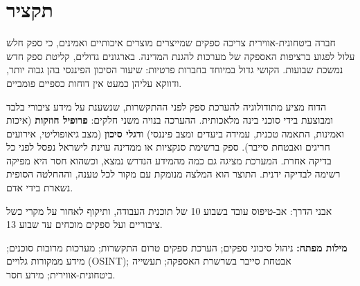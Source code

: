 \chapter*{תקציר}

חברה ביטחונית-אווירית צריכה ספקים שמייצרים מוצרים איכותיים ואמינים, כי ספק חלש עלול לפגוע ברציפות האספקה של מערכות להגנת המדינה. בארגונים גדולים, קליטת ספק חדש נמשכת שבועות. הקושי גדול במיוחד בחברות פרטיות: שיעור הסיכון הפיננסי בהן גבוה יותר, ודווקא עליהן כמעט אין דוחות כספיים פומביים.

הדוח מציע מתודולוגיה להערכת ספק לפני ההתקשרות, שנשענת על מידע ציבורי בלבד ומבוצעת בידי סוכני בינה מלאכותית. ההערכה בנויה משני חלקים: \textbf{פרופיל חוזקות} (איכות ואמינות, התאמה טכנית, עמידה ביעדים ומצב פיננסי) ו\textbf{דגלי סיכון} (מצב גיאופוליטי, אירועים חריגים ואבטחת סייבר). ספק ברשימת סנקציות או ממדינה עוינת לישראל נפסל לפני כל בדיקה אחרת. המערכת מציגה גם כמה מהמידע הנדרש נמצא, וכשהוא חסר היא מפיקה רשימה לבדיקה ידנית. התוצר הוא המלצה מנומקת עם מקור לכל טענה, וההחלטה הסופית נשארת בידי אדם.

אבני הדרך: אב-טיפוס עובד בשבוע 10 של תוכנית העבודה, ותיקוף לאחור על מקרי כשל ציבוריים ועל ספקים מוכחים עד שבוע 13.

\vspace{0.5cm}
\noindent\textbf{מילות מפתח:} ניהול סיכוני ספקים; הערכת ספקים טרום התקשרות; מערכות מרובות סוכנים; מידע ממקורות גלויים (\foreignlanguage{english}{OSINT}); אבטחת סייבר בשרשרת האספקה; תעשייה ביטחונית-אווירית; מידע חסר.

\clearpage
